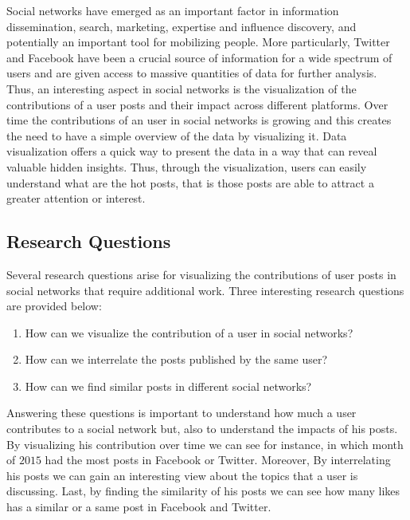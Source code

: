 Social networks have emerged as an important factor in information dissemination, search, marketing, expertise and influence discovery, and potentially an important tool for mobilizing people. More particularly, Twitter and Facebook have been a crucial source of information for a wide spectrum of users and are given access to massive quantities of data for further analysis. Thus, an interesting aspect in social networks is the visualization of the contributions of a user posts and their impact across different platforms. Over time the contributions of an user in social networks is growing and this creates the need to have a simple overview of the data by visualizing it. Data visualization offers a quick way to present the data in a way that can reveal valuable hidden insights. Thus, through the visualization, users can easily understand what are the hot posts, that is those posts are able to attract a greater attention or interest.


\subsection{Research Questions}


Several research questions arise for visualizing the contributions of user posts in social networks that require additional work. Three interesting research questions are provided below:


\begin{enumerate}
\item How can we visualize the contribution of a user in social networks?
\item How can we interrelate the posts published by the same user?
\item How can we find similar posts in different social networks?
\end{enumerate}


Answering these questions is important to understand how much a user contributes to a social network but, also to understand the impacts of his posts. By visualizing his contribution over time we can see for instance, in which month of $2015$ had the most posts in Facebook or Twitter. Moreover, By interrelating his posts we can gain an interesting view about the topics that a user is discussing. Last, by finding the similarity of his posts we can see how many likes has a similar or a same post in Facebook and Twitter.

